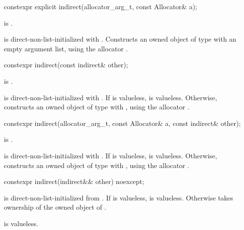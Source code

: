 %
\begin{itemdecl}
constexpr explicit indirect(allocator_arg_t, const Allocator& a);
\end{itemdecl}

\begin{itemdescr}
\pnum
\mandates
{} is .

\pnum
\effects
{} is direct-non-list-initialized with .
Constructs an owned object of type  with an empty argument list,
using the allocator .
\end{itemdescr}

%
\begin{itemdecl}
constexpr indirect(const indirect& other);
\end{itemdecl}

\begin{itemdescr}
\pnum
\mandates
{} is .

\pnum
\effects
{} is direct-non-list-initialized with
.
If  is valueless,  is valueless.
Otherwise,
constructs an owned object of type  with ,
using the allocator .
\end{itemdescr}

%
\begin{itemdecl}
constexpr indirect(allocator_arg_t, const Allocator& a, const indirect& other);
\end{itemdecl}

\begin{itemdescr}
\pnum
\mandates
{} is .

\pnum
\effects
{} is direct-non-list-initialized with .
If  is valueless,  is valueless.
Otherwise,
constructs an owned object of type  with ,
using the allocator .
\end{itemdescr}

%
\begin{itemdecl}
constexpr indirect(indirect&& other) noexcept;
\end{itemdecl}

\begin{itemdescr}
\pnum
\effects
{} is direct-non-list-initialized from
.
If  is valueless,  is valueless.
Otherwise  takes ownership of the owned object of .

\pnum
\ensures
{} is valueless.
\end{itemdescr}

